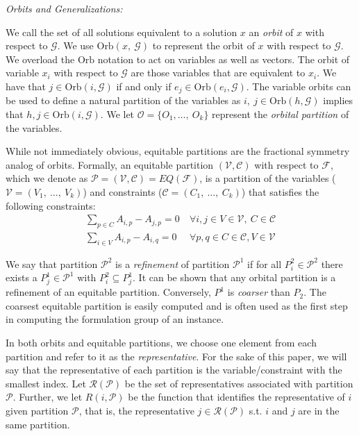 \documentclass[runningheads]{llncs}
\newcommand{\cP}{{\mathcal P}}
\newcommand{\cF}{{\mathcal F}}
\newcommand{\cG}{{\mathcal G}}
\newcommand{\cO}{{\mathcal O}}
\newcommand{\cC}{{\mathcal C}}
\newcommand{\cV}{{\mathcal V}}
\newcommand{\cR}{{\mathcal R}}
\begin{document}
{\em Orbits and Generalizations:}


We call the set of all solutions equivalent to a
solution $x$ an {\em orbit} of $x$ with respect to $\cG$. We use
$\mbox{Orb}(x,\ \cG)$ to represent the orbit of $x$ with respect to $\cG$. We
overload the $\mbox{Orb}$ notation to act on variables as well as vectors. The
orbit of variable $x_i$ with respect to $\cG$ are those variables that are
equivalent to $x_i$. We have that $j \in \mbox{Orb}(i,\cG)$ if and only if $e_j
\in \mbox{Orb}(e_i,\cG)$. The variable orbits can be used to define a natural
partition of the variables as $i,\ j \in \mbox{Orb}(h,\cG)$ implies that $h, j
\in \mbox{Orb}(i,\cG)$. We let $\cO= \{O_1,\ldots,\ O_k\}$ represent the {\em orbital partition} of the variables. 

While not immediately obvious, equitable partitions are the fractional symmetry analog of orbits. Formally, an equitable partition $(\cV, \cC)$ with respect to $\cF$, which we denote as $\cP = (\cV,\cC) =  EQ( \cF)$, is a partition of the variables ($\cV = (V_1,\ \ldots,\ V_k)$) and constraints ($\cC = (C_1,\ \ldots,\ C_k)$) that satisfies the following constraints:
\begin{align}
\sum_{p \in C} A_{i,p} - A_{j,p} = 0 & \ \forall i,j \in V \in \cV,\ C \in \cC\\
\sum_{i \in V} A_{i,p} - A_{i,q} = 0 & \ \forall p,q \in C \in \cC, V \in \cV 
\end{align}


We say that partition $\cP^2$ is a {\em refinement} of partition $\cP^1$ if for
all $P_i^2 \in \cP^2$ there exists a $P_j^1 \in \cP^1$ with $P_i^2 \subseteq
P_j^1$. It can be shown that any orbital partition is a refinement of an equitable partition. Conversely, $P^1$ is {\em coarser} than $P_2$. The coarsest equitable partition is easily computed and is often used as the first step in computing the formulation group of an instance. 

In both orbits and equitable partitions, we choose one element from each partition and refer to it as the {\em representative}. For the sake of this paper, we will say that the representative of each partition is the variable/constraint with the smallest index.  Let $\cR(\cP)$ be the set of representatives associated with partition $\cP$. Further, we let $R(i,\cP)$ be the function that identifies the representative of $i$ given partition $\cP$, that is, the representative $j \in \cR(\cP)$ s.t. $i$ and $j$ are in the same partition.
\end{document}
